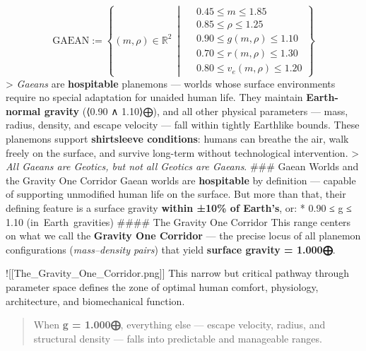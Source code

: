 \documentclass[
  letterpaper,
]{book}
\begin{document}
\[\text{GAEAN} := \left\{ (m, \rho) \in \mathbb{R}^2 \ \middle|\
\begin{aligned}
&0.45 \leq m \leq 1.85 \\
&0.85 \leq \rho \leq 1.25 \\
&0.90 \leq g(m, \rho) \leq 1.10 \\
&0.70 \leq r(m, \rho) \leq 1.30 \\
&0.80 \leq v_e(m, \rho) \leq 1.20
\end{aligned}
\right\}
\] \textgreater{} \emph{Gaeans} are \textbf{hospitable} planemons ---
worlds whose surface environments require no special adaptation for
unaided human life. They maintain \textbf{Earth-normal gravity} (⟨0.90 ∧
1.10⟩⨁), and all other physical parameters --- mass, radius, density,
and escape velocity --- fall within tightly Earthlike bounds. These
planemons support \textbf{shirtsleeve conditions}: humans can breathe
the air, walk freely on the surface, and survive long-term without
technological intervention. \textgreater{} \emph{All Gaeans are Geotics,
but not all Geotics are Gaeans}. \#\#\# Gaean Worlds and the Gravity One
Corridor Gaean worlds are \textbf{hospitable} by definition --- capable
of supporting unmodified human life on the surface. But more than that,
their defining feature is a surface gravity \textbf{within ±10\% of
Earth's}, or: * 0.90 ≤ g ≤ 1.10 (in~Earth~gravities) \#\#\#\# The
Gravity One Corridor This range centers on what we call the
\textbf{Gravity One Corridor} --- the precise locus of all planemon
configurations (\emph{mass--density pairs}) that yield \textbf{surface
gravity = 1.000⨁}.

!{[}{[}The\_Gravity\_One\_Corridor.png{]}{]} This narrow but critical
pathway through parameter space defines the zone of optimal human
comfort, physiology, architecture, and biomechanical function.

\begin{quote}
When \textbf{g = 1.000⨁}, everything else --- escape velocity, radius,
and structural density --- falls into predictable and manageable ranges.
\end{quote}
\end{document}
